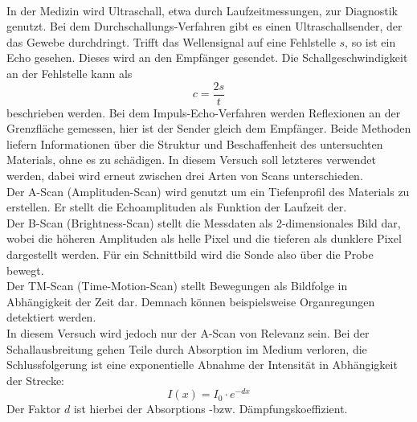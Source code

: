 \\
\noindent In der Medizin wird Ultraschall, etwa durch Laufzeitmessungen, zur Diagnostik
genutzt. Bei dem Durchschallungs-Verfahren gibt es einen Ultraschallsender,
der das Gewebe durchdringt. Trifft das Wellensignal auf eine Fehlstelle $s$, so 
ist ein Echo gesehen. Dieses wird an den Empfänger gesendet. Die Schallgeschwindigkeit 
an der Fehlstelle kann als
\begin{equation}
    \label{eqn:3}
    c = \frac{2s}{t}
\end{equation}
beschrieben werden.
Bei dem Impuls-Echo-Verfahren werden Reflexionen an der Grenzfläche gemessen, hier 
ist der Sender gleich dem Empfänger. Beide Methoden liefern Informationen über
die Struktur und Beschaffenheit des untersuchten Materials, ohne es zu schädigen.
In diesem Versuch soll letzteres verwendet werden, dabei wird erneut zwischen 
drei Arten von Scans unterschieden.
\vspace{0.5em}
\\
\noindent Der A-Scan (Amplituden-Scan) wird genutzt um ein Tiefenprofil des 
Materials zu erstellen. Er stellt die Echoamplituden als Funktion der Laufzeit
der.
\vspace{0.5em}
\\
\noindent Der B-Scan (Brightness-Scan) stellt die Messdaten als 2-dimensionales 
Bild dar, wobei die höheren Amplituden als helle Pixel und die tieferen als 
dunklere Pixel dargestellt werden. Für ein Schnittbild wird die Sonde also 
über die Probe bewegt.
\vspace{0.5em}
\\
\noindent Der TM-Scan (Time-Motion-Scan) stellt Bewegungen als Bildfolge in 
Abhängigkeit der Zeit dar. Demnach können beispielsweise Organregungen 
detektiert werden.
\vspace{0.5em}
\\
In diesem Versuch wird jedoch nur der A-Scan von Relevanz sein.
Bei der Schallausbreitung gehen Teile durch Absorption im Medium verloren, die 
Schlussfolgerung ist eine exponentielle Abnahme der Intensität in Abhängigkeit 
der Strecke:
\begin{equation}
    \label{eqn:4}
    I(x) = I_0 \cdot e^{-dx}
\end{equation}
Der Faktor $d$ ist hierbei der Absorptions -bzw. Dämpfungskoeffizient.


